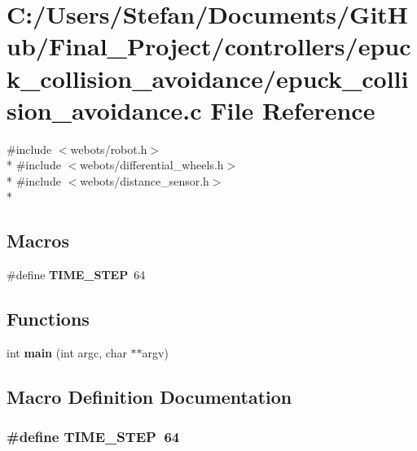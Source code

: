 \section{C\-:/\-Users/\-Stefan/\-Documents/\-Git\-Hub/\-Final\-\_\-\-Project/controllers/epuck\-\_\-collision\-\_\-avoidance/epuck\-\_\-collision\-\_\-avoidance.c File Reference}
\label{epuck__collision__avoidance_8c}
{\ttfamily \#include $<$webots/robot.\-h$>$}\\*
{\ttfamily \#include $<$webots/differential\-\_\-wheels.\-h$>$}\\*
{\ttfamily \#include $<$webots/distance\-\_\-sensor.\-h$>$}\\*
\subsection*{Macros}
\begin{DoxyCompactItemize}
\item 
\#define {\bf T\-I\-M\-E\-\_\-\-S\-T\-E\-P}~64
\end{DoxyCompactItemize}
\subsection*{Functions}
\begin{DoxyCompactItemize}
\item 
int {\bf main} (int argc, char $\ast$$\ast$argv)
\end{DoxyCompactItemize}


\subsection{Macro Definition Documentation}
\subsubsection[{T\-I\-M\-E\-\_\-\-S\-T\-E\-P}]{\setlength{\rightskip}{0pt plus 5cm}\#define T\-I\-M\-E\-\_\-\-S\-T\-E\-P~64}\label{epuck__collision__avoidance_8c_a65fd90f232757535f02c46a885e49012}


